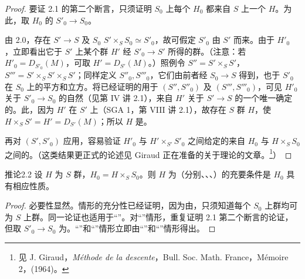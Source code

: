 \begin{proof}
要证 2.1 的第二个断言，只须证明 $S_0$ 上每个 $H_0$ 都来自 $S$ 上一个 $H$。为此，取 $H_0$ 的 $S'_0\to S_0$。

由 2.0，存在 $S'\to S$ 及 $S_0$  $S'\times_S S_0\simeq S'_0$，故可假定 $S'_0$ 由 $S'$ 而来。由于 $H'_0$ ，立即看出它于 $S'$ 上某个群 $H'$ 经 $S'_0\to S'$ 所得的群。（注意：若 $H'_0=D_{S'_0}(M)$，可取 $H'=D_{S'}(M)$。）照例令 $S''=S'\times_S S'$，$S'''=S'\times_S S'\times_S S'$；同样定义 $S''_0,S'''_0$，它们由前者经 $S_0\to S$ 得到，也于 $S'_0$ 在 $S_0$ 上的平方和立方。将已经证明的用于 $(S'',S''_0)$ 及 $(S''',S'''_0)$，可见 $H'_0$ 关于 $S'_0\to S_0$ 的自然（见第 IV 讲 2.1），来自 $H'$ 关于 $S'\to S$ 的一个唯一确定的。此，因为 $H'$ 在 $S'$ 上（SGA 1，第 VIII 讲 2.1），故存在 $S$ 群 $H$，使 $H\times_S S'=H'=D_{S'}(M)$；所以 $H$ 是。

再对 $(S',S'_0)$ 应用，容易验证 $H'_0$ 与 $H'\times_{S'}S'_0$ 之间给定的来自 $H_0$ 与 $H\times_S S_0$ 之间的。（这类结果更正式的论述见 Giraud 正在准备的关于理论的文章。\footnote{见 J. Giraud，\emph{Méthode de la descente}，Bull. Soc. Math. France，Mémoire 2，(1964)。}）
\end{proof}
\begin{SGAresult}{推论}{2.2}
设 $H$ 为 $S$ 群，$H_0=H\times_S S_0$。则 $H$ 为（分别、、、）的充要条件是 $H_0$ 具有相应性质。
\end{SGAresult}
\begin{proof}
必要性显然。情形的充分性已经证明，因为由，只须知道每个 $S_0$ 上群均可为 $S$ 上群。同一论证也适用于“”。对“”情形，重复证明 2.1 第二个断言的论证，但取 $S'_0\to S_0$ 为。“”和“”情形立即由“”和“”情形得出。
\end{proof}
